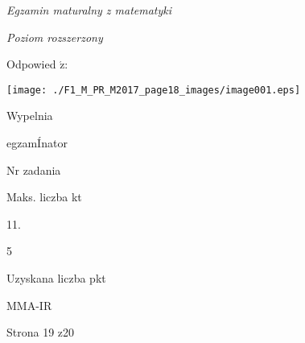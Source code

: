 \documentclass[a4paper,12pt]{article}
\begin{document}
{\it Egzamin maturalny z matematyki}

{\it Poziom rozszerzony}

Odpowied $\acute{\mathrm{z}}$:
\begin{center}
\texttt{[image: ./F1\_M\_PR\_M2017\_page18\_images/image001.eps]}
\end{center}
Wypelnia

egzamÍnator

Nr zadania

Maks. liczba kt

11.

5

Uzyskana liczba pkt

MMA-IR

Strona 19 z20
\end{document}
